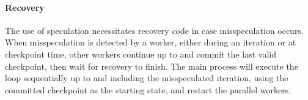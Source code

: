 \paragraph{Recovery}
The use of speculation necessitates recovery code in case
misspeculation occurs.
When misspeculation is detected by a worker, either during an
iteration or at checkpoint time, other workers continue up to and commit the last
valid checkpoint, then wait for recovery to finish.
The main process will execute the loop
sequentially up to and including the misspeculated iteration, using the
committed checkpoint as the starting state, and restart the parallel
workers.
